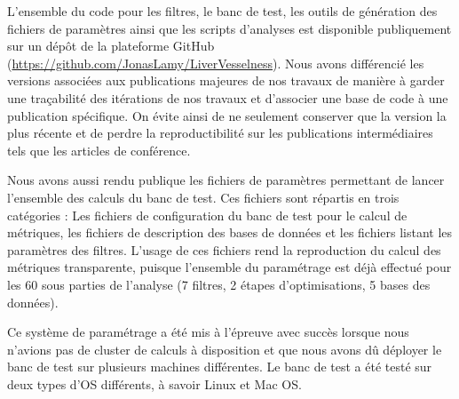 L'ensemble du code pour les filtres, le banc de test, les outils de génération des fichiers de paramètres ainsi que les scripts d'analyses est disponible publiquement sur un dépôt de la plateforme GitHub (\url{https://github.com/JonasLamy/LiverVesselness}). Nous avons différencié les versions associées aux publications majeures de nos travaux de manière à garder une traçabilité des itérations de nos travaux et d'associer une base de code à une publication spécifique. On évite ainsi de ne seulement conserver que la version la plus récente et de perdre la reproductibilité sur les publications intermédiaires tels que les articles de conférence.

Nous avons aussi rendu publique les fichiers de paramètres permettant de lancer l'ensemble des calculs du banc de test. Ces fichiers sont répartis en trois catégories : Les fichiers de configuration du banc de test pour le calcul de métriques, les fichiers de description des bases de données et les fichiers listant les paramètres des filtres. L'usage de ces fichiers rend la reproduction du calcul des métriques transparente, puisque l'ensemble du paramétrage est déjà effectué pour les 60 sous parties de l'analyse (7 filtres, 2 étapes d'optimisations, 5 bases des données).

Ce système de paramétrage a été mis à l'épreuve avec succès lorsque nous n'avions pas de cluster de calculs à disposition et que nous avons dû déployer le banc de test sur plusieurs machines différentes. Le banc de test a été testé sur deux types d'OS différents, à savoir Linux et Mac OS.

\begin{table}[!t]
    \caption{ Tableau récapitulant les propriétés de notre banc de test. Bien que reproductibles, certaines étapes nécessitent une modification manuelle en fonction des bases de données. }
    \label{ tab:reproductibility }
\end{table}

